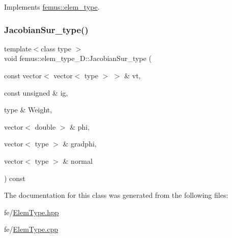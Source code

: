 Implements \mbox{\hyperlink{classfemus_1_1elem__type_aee56bc66a4d90ae7f7669bf7fa9ed8d7}{femus\+::elem\+\_\+type}}.

\mbox{\label{classfemus_1_1elem__type__2_d_af324b839f42e9643b0297da480be49c1}} 
\subsubsection{\texorpdfstring{Jacobian\+Sur\+\_\+type()}{JacobianSur\_type()}}
{\footnotesize\ttfamily template$<$class type $>$ \\
void femus\+::elem\+\_\+type\+\_\+D\+::\+Jacobian\+Sur\+\_\+type (\begin{DoxyParamCaption}\item[{const vector$<$ vector$<$ type $>$ $>$ \&}]{vt,  }\item[{const unsigned \&}]{ig,  }\item[{type \&}]{Weight,  }\item[{vector$<$ double $>$ \&}]{phi,  }\item[{vector$<$ type $>$ \&}]{gradphi,  }\item[{vector$<$ type $>$ \&}]{normal }\end{DoxyParamCaption}) const}



The documentation for this class was generated from the following files\+:\begin{DoxyCompactItemize}
\item 
fe/\mbox{\hyperlink{_elem_type_8hpp}{Elem\+Type.\+hpp}}\item 
fe/\mbox{\hyperlink{_elem_type_8cpp}{Elem\+Type.\+cpp}}\end{DoxyCompactItemize}
